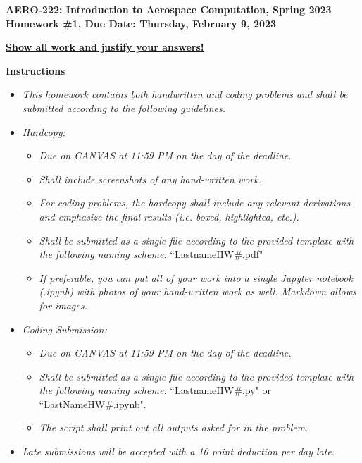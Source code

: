 \documentclass[12pt]{article}
\begin{document}
\newif\ifsolution    %

\solutiontrue
     
\begin{center}{\bf AERO-222: Introduction to Aerospace Computation, Spring 2023\\ Homework \#1, Due Date: Thursday, February 9, 2023} \vspace{0.5cm}

\textbf{\underline{Show all work and justify your answers!}} \vspace{0.5cm}
\end{center}

{\Large \textbf{Instructions}}

\begin{itemize}
	\item \textit{This homework contains both handwritten and coding problems and shall be submitted according to the following guidelines.}
	\item \textit{Hardcopy:}
	\begin{itemize}
	    \item \textit{Due on CANVAS at 11:59 PM on the day of the deadline.}
	    \item \textit{Shall include screenshots of any hand-written work.}
	    \item \textit{For coding problems, the hardcopy shall include any relevant derivations and emphasize the final results (i.e. boxed, highlighted, etc.).}
	    \item \textit{Shall be submitted as a single file according to the provided template with the following naming scheme:} ``LastnameHW\#.pdf"
	    \item \textit{If preferable, you can put all of your work into a single Jupyter notebook (.ipynb) with photos of your hand-written work as well. Markdown allows for images. }
	\end{itemize}
	\item \textit{Coding Submission:}
	\begin{itemize}
	    \item \textit{Due on CANVAS at 11:59 PM on the day of the deadline.}
	    \item \textit{Shall be submitted as a single file according to the provided template with the following naming scheme:} ``LastnameHW\#.py" or ``LastNameHW\#.ipynb".
	    \item \textit{The script shall print out all outputs asked for in the problem}.
	\end{itemize}
    \item \textit{Late submissions will be accepted with a 10 point deduction per day late.}
\end{itemize}
\hrulefill
\end{document}
